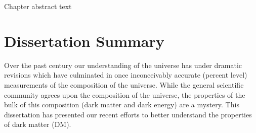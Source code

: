 \label{chapter:5}

Chapter abstract text

\section{Dissertation Summary}

Over the past century our understanding of the universe has under dramatic revisions which have culminated in once inconceivably accurate (percent level) measurements of the composition of the universe.
While the general scientific community agrees upon the composition of the universe, the properties of the bulk of this composition (dark matter and dark energy) are a mystery.
This dissertation has presented our recent efforts to better understand the properties of dark matter (DM).

